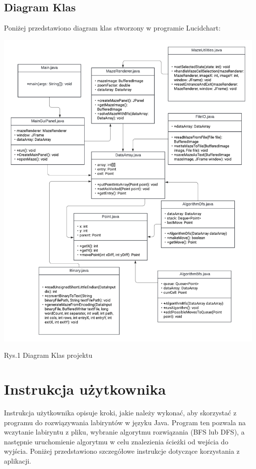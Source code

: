 \documentclass{article}
\begin{document}
\subsection{Diagram Klas}
Poniżej przedstawiono diagram klas stworzony w programie Lucidchart:

    \includegraphics[width=\textwidth]{UML class.png}
    \begin{center}
        \caption{Rys.1 Diagram Klas projektu}
    \end{center}
\restoregeometry

\section{Instrukcja użytkownika}

Instrukcja użytkownika opisuje kroki, jakie należy wykonać, aby skorzystać z programu do rozwiązywania labiryntów w języku Java. Program ten pozwala na wczytanie labiryntu z pliku, wybranie algorytmu rozwiązania (BFS lub DFS), a następnie uruchomienie algorytmu w celu znalezienia ścieżki od wejścia do wyjścia. Poniżej przedstawiono szczegółowe instrukcje dotyczące korzystania z aplikacji.
\end{document}
